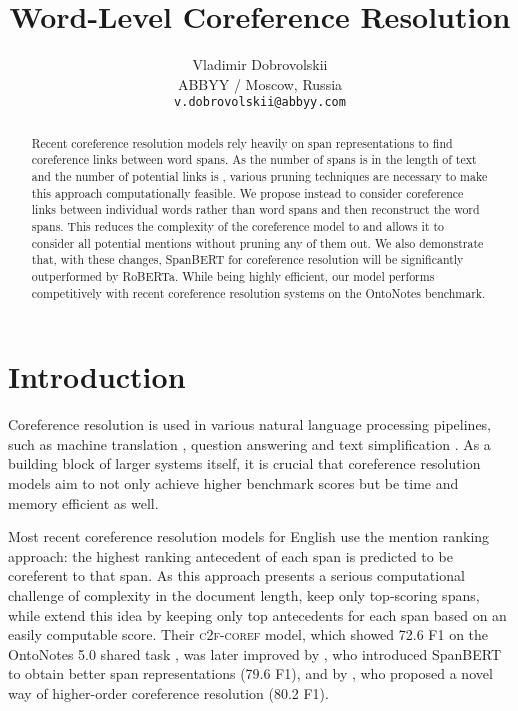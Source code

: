 \documentclass[11pt]{article}
\title{Word-Level Coreference Resolution}
\author{Vladimir Dobrovolskii \\
  ABBYY / Moscow, Russia \\
  \texttt{v.dobrovolskii@abbyy.com} \\ }
\begin{document}
\maketitle
\begin{abstract}
Recent coreference resolution models rely heavily on span representations to find coreference links between word spans. As the number of spans is  in the length of text and the number of potential links is , various pruning techniques are necessary to make this approach computationally feasible. We propose instead to consider coreference links between individual words rather than word spans and then reconstruct the word spans. This reduces the complexity of the coreference model to  and allows it to consider all potential mentions without pruning any of them out. We also demonstrate that, with these changes, SpanBERT for coreference resolution will be significantly outperformed by RoBERTa. While being highly efficient, our model performs competitively with recent coreference resolution systems on the OntoNotes benchmark.
\end{abstract}

\section{Introduction}
Coreference resolution is used in various natural language processing pipelines, such as machine translation \citep{ohtani-etal-2019-context, miculicich-werlen-popescu-belis-2017-using}, question answering \citep{dhingra-etal-2018-neural} and text simplification \citep{wilkens-etal-2020-coreference}. As a building block of larger systems itself, it is crucial that coreference resolution models aim to not only achieve higher benchmark scores but be time and memory efficient as well.

Most recent coreference resolution models for English use the mention ranking approach: the highest ranking antecedent of each span is predicted to be coreferent to that span.
As this approach presents a serious computational challenge of  complexity in the document length, \citet{lee-etal-2017-end} keep only  top-scoring spans, while \citet{lee-etal-2018-higher} extend this idea by keeping only top  antecedents for each span based on an easily computable score. Their \textsc{c2f-coref} model, which showed 72.6 F1 on the OntoNotes 5.0 shared task \citep{pradhan-etal-2012-conll}, was later improved by \citet{joshi-etal-2020-spanbert}, who introduced SpanBERT to obtain better span representations (79.6 F1), and by \citet{xu-choi-2020-revealing}, who proposed a novel way of higher-order coreference resolution (80.2 F1).
\end{document}

